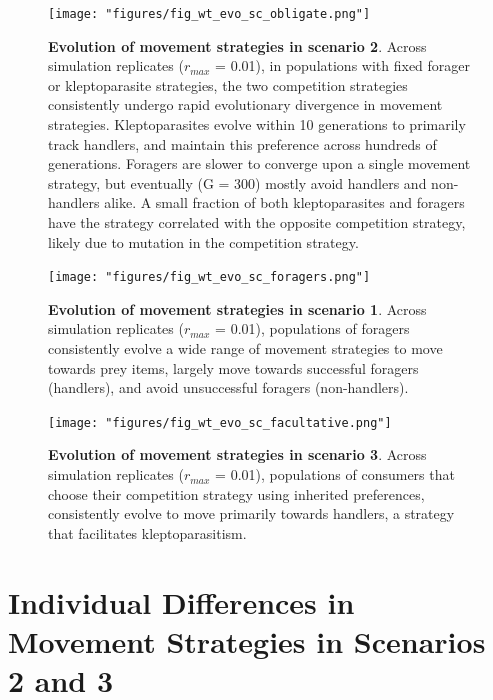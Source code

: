 \documentclass[]{scrartcl}
\begin{document}
\begin{figure}
\centering
\texttt{[image: "figures/fig\_wt\_evo\_sc\_obligate.png"]}
\caption{\textbf{Evolution of movement strategies in scenario 2}. Across simulation replicates (\(r_{max}\) = 0.01), in populations with fixed forager or kleptoparasite strategies, the two competition strategies consistently undergo rapid evolutionary divergence in movement strategies. Kleptoparasites evolve within 10 generations to primarily track handlers, and maintain this preference across hundreds of generations. Foragers are slower to converge upon a single movement strategy, but eventually (G = 300) mostly avoid handlers and non-handlers alike. A small fraction of both kleptoparasites and foragers have the strategy correlated with the opposite competition strategy, likely due to mutation in the competition strategy.}
\end{figure}

\begin{figure}
\centering
\texttt{[image: "figures/fig\_wt\_evo\_sc\_foragers.png"]}
\caption{\textbf{Evolution of movement strategies in scenario 1}. Across simulation replicates (\(r_{max}\) = 0.01), populations of foragers consistently evolve a wide range of movement strategies to move towards prey items, largely move towards successful foragers (handlers), and avoid unsuccessful foragers (non-handlers).}
\end{figure}

\begin{figure}
\centering
\texttt{[image: "figures/fig\_wt\_evo\_sc\_facultative.png"]}
\caption{\textbf{Evolution of movement strategies in scenario 3}. Across simulation replicates (\(r_{max}\) = 0.01), populations of consumers that choose their competition strategy using inherited preferences, consistently evolve to move primarily towards handlers, a strategy that facilitates kleptoparasitism.}
\end{figure}

\newpage

\hypertarget{individual-differences-in-movement-strategies-in-scenarios-2-and-3}{%
\section{Individual Differences in Movement Strategies in Scenarios 2 and 3}\label{individual-differences-in-movement-strategies-in-scenarios-2-and-3}}
\end{document}
